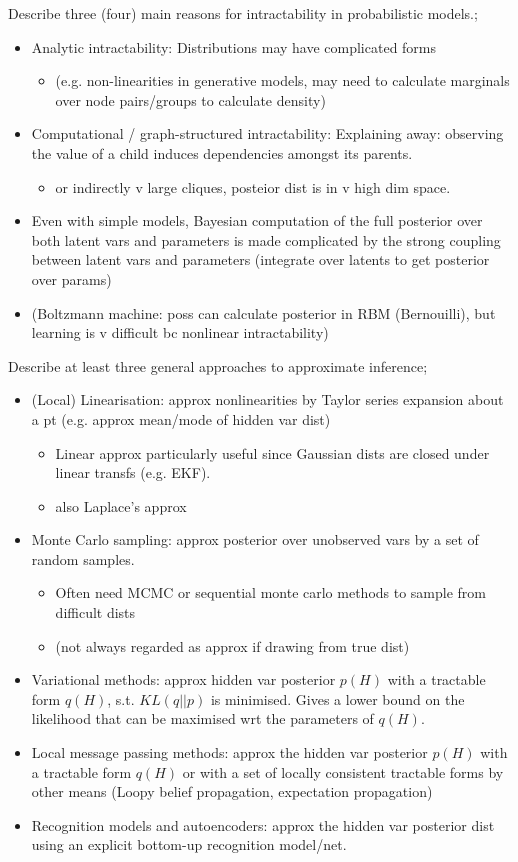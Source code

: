 \documentclass{article}
\begin{document}
Describe three (four) main reasons for intractability in probabilistic models.; \begin{itemize} \item Analytic intractability: Distributions may have complicated forms \begin{itemize} \item (e.g. non-linearities in generative models, may need to calculate marginals over node pairs/groups to calculate density) \end{itemize} \item Computational / graph-structured intractability: Explaining away: observing the value of a child induces dependencies amongst its parents. \begin{itemize} \item or indirectly v large cliques, posteior dist is in v high dim space. \end{itemize} \item Even with simple models, Bayesian computation of the full posterior over both latent vars and parameters is made complicated by the strong coupling between latent vars and parameters (integrate over latents to get posterior over params) \item (Boltzmann machine: poss can calculate posterior in RBM (Bernouilli), but learning is v difficult bc nonlinear intractability) \end{itemize}

Describe at least three general approaches to approximate inference; \begin{itemize} \item (Local) Linearisation: approx nonlinearities by Taylor series expansion about a pt (e.g. approx mean/mode of hidden var dist) \begin{itemize} \item Linear approx particularly useful since Gaussian dists are closed under linear transfs (e.g. EKF). \item also Laplace's approx \end{itemize} \item Monte Carlo sampling: approx posterior over unobserved vars by a set of random samples. \begin{itemize} \item Often need MCMC or sequential monte carlo methods to sample from difficult dists \item (not always regarded as approx if drawing from true dist) \end{itemize} \item Variational methods: approx hidden var posterior $p(H)$ with a tractable form $q(H)$, s.t. $KL(q||p)$ is minimised. Gives a lower bound on the likelihood that can be maximised wrt the parameters of $q(H)$. \item Local message passing methods: approx the hidden var posterior $p(H)$ with a tractable form $q(H)$ or with a set of locally consistent tractable forms by other means (Loopy belief propagation, expectation propagation) \item Recognition models and autoencoders: approx the hidden var posterior dist using an explicit bottom-up recognition model/net. \end{itemize}
\end{document}
